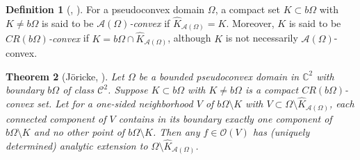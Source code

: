 \documentclass[12pt,reqno, a4paper]{amsart}
\newtheorem{theorem}{Theorem}[section]
\theoremstyle{definition}
\theoremstyle{definition}
\newtheorem{definition}[theorem]{Definition}
\numberwithin{equation}{section}
\def\C{\mathbb{C}}                              %
\begin{document}
\begin{definition}[\cite{stout}, \cite{jor2}]
For a pseudoconvex domain $\Omega$, a compact set $K \subset b\Omega$ with $K \neq b\Omega$ is said to be  \textit{{$\mathcal{A}(\Omega)$-convex}} if ${\widehat{K}}_{\mathcal{A}(\Omega)}=K$. Moreover, $K$ is said to be \textit{$CR(b\Omega)$-convex} if $K = b\Omega \cap {\widehat{K}}_{\mathcal{A}(\Omega)}$, although $K$ is not necessarily $\mathcal{A}(\Omega)$-convex.
\end{definition}
\begin{theorem}[J\"oricke, \cite{jor2}]\label{jor2}
	Let $\Omega$ be a bounded pseudoconvex domain in $\C^2$ with boundary $b\Omega$ of class
	$\mathcal{C}^2$. Suppose $K \subset b\Omega$ with $K \neq b\Omega$ is a compact $CR(b\Omega)$-convex set. Let for a one-sided neighborhood $V$ of $b\Omega \setminus K$ with $V \subset \Omega \setminus {\widehat{K}_{\mathcal{A}(\Omega)}}$, each
	connected component of $V$ contains in its boundary exactly one component of $b\Omega \setminus K$
	and no other point of $b \Omega \setminus K$. Then any $f\in \mathcal{O}(V)$ has (uniquely
	determined) analytic extension to $\Omega \setminus {\widehat{K}}_{\mathcal{A}(\Omega)}$.		
\end{theorem}
\end{document}
